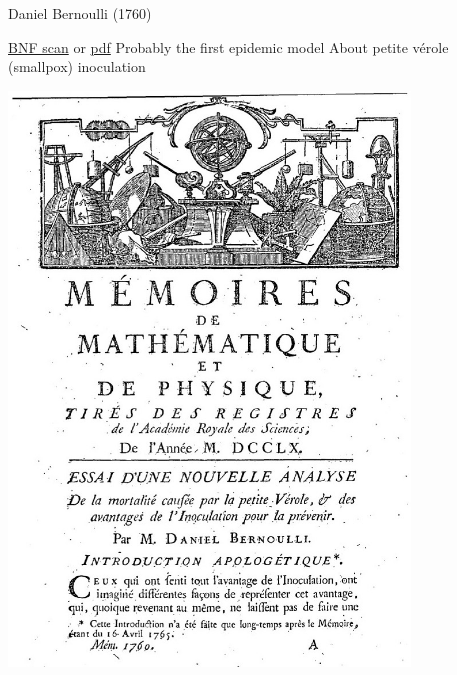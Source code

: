 \documentclass[aspectratio=169]{beamer}\usepackage[]{graphicx}\usepackage[]{xcolor}
\begin{document}
\begin{frame}{Daniel Bernoulli (1760)}
\begin{minipage}{0.47\textwidth}
\bbullet \href{https://gallica.bnf.fr/ark:/12148/bpt6k3558n/f220.item}{BNF scan} or \href{https://julien-arino.github.io/assets/pdf/Bernoulli-1760.pdf}{pdf}
\vskip1cm
\bbullet Probably the first epidemic model
\vskip1cm
\bbullet About petite vérole (smallpox) inoculation    
\end{minipage}
\begin{minipage}{0.5\textwidth}
    \includegraphics[width=0.8\textwidth]{FIGS/Bernoulli-1760-first_page.jpg}
\end{minipage}
\end{frame}
\end{document}
